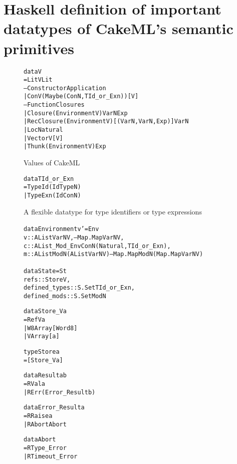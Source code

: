 \chapter{Haskell definition of important datatypes of CakeML's semantic primitives}
\label{app:semprim}

\begin{figure}
\begin{alltt}
data V
  = LitV Lit
  -- Constructor Application
  | ConV (Maybe (ConN, TId_or_Exn)) [V]
  -- Function Closures
  | Closure (Environment V) VarN Exp
  | RecClosure (Environment V) [(VarN, VarN, Exp)] VarN
  | Loc Natural
  | VectorV [V]
  | Thunk (Environment V) Exp
\end{alltt}
\caption{Values of CakeML}
\end{figure}

\begin{figure}
\begin{alltt}
data TId_or_Exn
  = TypeId (Id TypeN)
  | TypeExn (Id ConN)
\end{alltt}
\caption{A flexible datatype for type identifiers or type expressions}
\end{figure}

\begin{figure}
\begin{alltt}
data Environment v' = Env {
  v :: AList VarN V, -- Map.Map VarN V,
  c :: AList_Mod_Env ConN (Natural, TId_or_Exn),
  m :: AList ModN (AList VarN V) -- Map.Map ModN (Map.Map VarN V)
  }
\end{alltt}
\end{figure}

\begin{figure}
\begin{alltt}
data State = St {
  refs          :: Store V,
  defined_types :: S.Set TId_or_Exn,
  defined_mods  :: S.Set ModN
 }
\end{alltt}
\end{figure}

\begin{figure}
\begin{alltt}
data Store_V a
  = RefV a
  | W8Array [Word8]
  | VArray [a]
\end{alltt}
\end{figure}

\begin{figure}
\begin{alltt}
type Store a
  = [Store_V a]
\end{alltt}
\end{figure}

\begin{figure}
\begin{alltt}
data Result a b
  = RVal a
  | RErr (Error_Result b)
\end{alltt}
\end{figure}


\begin{figure}
\begin{alltt}
data Error_Result a
  = RRaise a
  | RAbort Abort

data Abort
  = RType_Error
  | RTimeout_Error
\end{alltt}
\end{figure}
